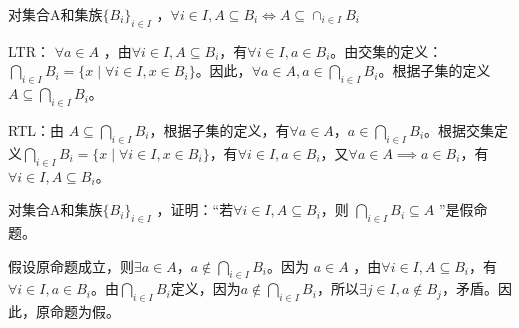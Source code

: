 

\begin{issues}
\issueDraft
\end{issues}

\begin{corollary}{}
对集合A和集族$\{B_i\}_{i \in I}$ ，$\forall i\in I,A\subseteq B_i\iff A\subseteq  \cap_{i\in I} B_i$
\end{corollary}

LTR： $\forall a \in A$ ，由$\forall i \in I,A \subseteq B_i$，有$\forall i \in I,a \in B_i$。由交集的定义：$\bigcap_{i \in I} B_i = \{ x \mid \forall i \in I,x \in B_i\}$。因此，$\forall a\in A,a\in\bigcap_{i \in I} B_i$。根据子集的定义$A \subseteq \bigcap_{i \in I} B_i$。

RTL：由 $A \subseteq \bigcap_{i \in I} B_i$，根据子集的定义，有$\forall a \in A$，$a \in \bigcap_{i \in I} B_i$。根据交集定义$\bigcap_{i \in I} B_i = \{ x \mid \forall i \in I,x \in B_i\}$，有$\forall i \in I,a \in B_i$，又$\forall a \in A\implies a \in B_i$，有$\forall i \in I,A\subseteq B_i$。

\begin{exercise}{}
对集合A和集族$\{B_i\}_{i \in I}$ ，证明：“若$\forall i \in I,A \subseteq B_i$，则 $\bigcap_{i \in I} B_i\subseteq A$ ”是假命题。
\end{exercise}

假设原命题成立，则$\exists a \in A$，$a \notin \bigcap_{i \in I} B_i$。因为 $a \in A$ ，由$\forall i \in I,A \subseteq B_i$，有$\forall i \in I,a \in B_i$。由$\bigcap_{i \in I} B_i$定义，因为$a\notin\bigcap_{i \in I} B_i$，所以$\exists j\in I,a \notin B_j$，矛盾。因此，原命题为假。

